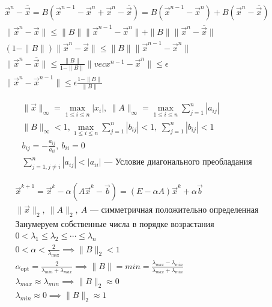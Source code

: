 \begin{note}
  \begin{gather*}
    \vec{x}^n - \overline{\vec{x}} = B (\vec{x}^{n - 1} - \vec{x}^n + \vec{x}^n
    - \overline{\vec{x}}) = B(\vec{x}^{n - 1} - \vec{x}^n) + B(\vec{x}^n -
    \overline{\vec{x}}) \\
    \|\vec{x}^n - \vec{x}\| \leq \|B\| \|\vec{x}^{n - 1} - \vec{x}^n\| + \|B\|
    \|\vec{x}^n - \overline{\vec{x}}\| \\
    (1 - \|B\|) \|\vec{x}^n - \vec{x}\| \leq \|B\| \| \vec{x}^{n -1} -
    \vec{x}^n\| \\
    \|\vec{x}^n - \overline{\vec{x}}\| \leq \frac{\|B\|}{1 - \|B\|} \|vec{x}^{n
      - 1} - \vec{x}^n\| \leq \epsilon \\
    \|\vec{x}^n - \vec{x}^{n - 1}\| \leq \epsilon \frac{1 - \|B\|}{\|B\|}
  \end{gather*}
\end{note}

\begin{gather*}
  \|\vec{x}\|_\infty = \max_{1 \leq i \leq n} |x_i|,\ \|A\|_\infty = \max_{1
    \leq i \leq n} \sum_{j = 1}^n |a_{ij}| \\
  \|B\|_\infty < 1, \max_{1 \leq i \leq n} \sum_{j = 1}^n |b_{ij}| < 1,\ \sum_{j
    = 1}^n |b_{ij}| < 1 \\
  b_{ij} = - \frac{a_{ij}}{a_{ii}},\ b_{ii} = 0 \\
  \sum_{j = 1, j \neq i}^n |a_{ij}| < |a_{ii}| \text{ --- Условие диагонального преобладания}
\end{gather*}

\begin{gather*}
  \vec{x}^{k + 1} = \vec{x}^k - \alpha(A \vec{x}^k - \vec{b}) = (E - \alpha A)
  \vec{x}^k + \alpha \vec{b}\\
  \|\vec{x}\|_2,\ \|A\|_2,\ A \text{ --- симметричная положительно
    определенная}\\
  \text{Занумеруем собственные числа в порядке возрастания} \\
  0 < \lambda_1 \leq \lambda_2 \leq \cdots \leq \lambda_n \\
  0 < \alpha < \frac{2}{\lambda_{\text{max}}} \implies \|B\|_2 < 1 \\
  \alpha_{\text{opt}} = \frac{2}{\lambda_{min} + \lambda_{max}} \implies \|B\| =
  min = \frac{\lambda_{max} - \lambda_{min}}{\lambda_{max} + \lambda_{min}} \\
  \lambda_{max} \approx \lambda_{min} \implies \|B\|_2 \approx 0 \\
  \lambda_{min} \approx 0 \implies \|B\|_2 \approx 1
\end{gather*}
